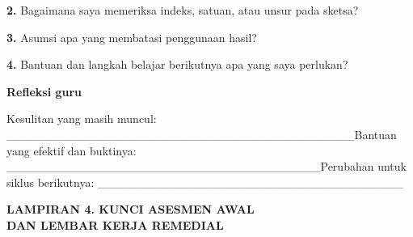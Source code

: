 \documentclass[11pt,a4paper]{article}
\begin{document}
\noindent\textbf{2.} Bagaimana saya memeriksa indeks, satuan, atau unsur pada sketsa?\par\vspace{6mm}
\noindent\textbf{3.} Asumsi apa yang membatasi penggunaan hasil?\par\vspace{6mm}
\noindent\textbf{4.} Bantuan dan langkah belajar berikutnya apa yang saya perlukan?\par\vspace{6mm}
\par\medskip\noindent\textbf{Refleksi guru}\par\smallskip
{\small Kesulitan yang masih muncul: \_\_\_\_\_\_\_\_\_\_\_\_\_\_\_\_\_\_\_\_\_\_\_\_\_\_\_\_\_\_\_\_\_\_\_\_\_\_\_\_\_\newline Bantuan yang efektif dan buktinya: \_\_\_\_\_\_\_\_\_\_\_\_\_\_\_\_\_\_\_\_\_\_\_\_\_\_\_\_\_\_\_\_\_\_\_\_\_\newline Perubahan untuk siklus berikutnya: \_\_\_\_\_\_\_\_\_\_\_\_\_\_\_\_\_\_\_\_\_\_\_\_\_\_\_\_\_\_\_\_\_\_\_\_\par}\medskip
\clearpage
\begin{center}\bfseries\large LAMPIRAN 4. KUNCI ASESMEN AWAL\\[2pt] DAN LEMBAR KERJA REMEDIAL\end{center}\medskip
\end{document}

